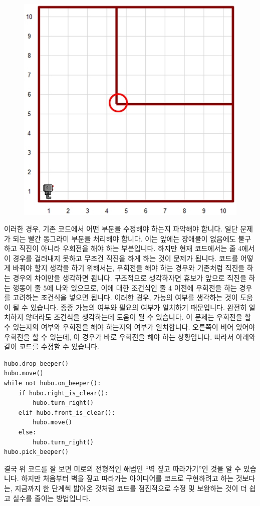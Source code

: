\documentclass[../main.tex]{subfiles}
\begin{document}
\begin{figure}[H]
\centering
\includegraphics[width=0.5\linewidth]{"./lectures/lecture7_exception"}
\label{fig:lecture7exception}
\end{figure}

이러한 경우, 기존 코드에서 어떤 부분을 수정해야 하는지 파악해야 합니다.
일단 문제가 되는 빨간 동그라미 부분을 처리해야 합니다.
이는 앞에는 장애물이 없음에도 불구하고 직진이 아니라 우회전을 해야 하는 부분입니다.
하지만 현재 코드에서는 줄 4에서 이 경우를 걸러내지 못하고 무조건 직진을 하게 하는 것이 문제가 됩니다.
코드를 어떻게 바꿔야 할지 생각을 하기 위해서는, 우회전을 해야 하는 경우와 기존처럼 직진을 하는 경우의 차이만을 생각하면 됩니다.
구조적으로 생각하자면 휴보가 앞으로 직진을 하는 행동이 줄 5에 나와 있으므로, 이에 대한 조건식인 줄 4 이전에 우회전을 하는 경우를 고려하는 조건식을 넣으면 됩니다.
이러한 경우, 가능의 여부를 생각하는 것이 도움이 될 수 있습니다.
종종 가능의 여부와 필요의 여부가 일치하기 때문입니다.
완전히 일치하지 않더라도 조건식을 생각하는데 도움이 될 수 있습니다.
이 문제는 우회전을 할 수 있는지의 여부와 우회전을 해야 하는지의 여부가 일치합니다.
오른쪽이 비어 있어야 우회전을 할 수 있는데, 이 경우가 바로 우회전을 해야 하는 상황입니다.
따라서 아래와 같이 코드를 수정할 수 있습니다.

\begin{verbatim}
hubo.drop_beeper()
hubo.move()
while not hubo.on_beeper():
    if hubo.right_is_clear():
        hubo.turn_right()
    elif hubo.front_is_clear():
        hubo.move()
    else:
        hubo.turn_right()
hubo.pick_beeper()
\end{verbatim}

결국 위 코드를 잘 보면 미로의 전형적인 해법인 ``벽 짚고 따라가기''인 것을 알 수 있습니다.
하지만 처음부터 벽을 짚고 따라가는 아이디어를 코드로 구현하려고 하는 것보다는, 지금까지 한 단계씩 밟아온 것처럼 코드를 점진적으로 수정 및 보완하는 것이 더 쉽고 실수를 줄이는 방법입니다.
\end{document}
